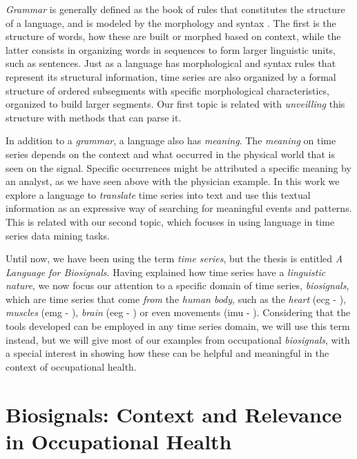 \textit{Grammar} is generally defined as the book of rules that constitutes the structure of a language, and is modeled by the morphology and syntax \cite{grammar}. The first is the structure of words, how these are built or morphed based on context, while the latter consists in organizing words in sequences to form larger linguistic units, such as sentences. Just as a language has morphological and syntax rules that represent its structural information, time series are also organized by a formal structure of ordered subsegments with specific morphological characteristics, organized to build larger segments. Our first topic is related with \textit{unveilling} this structure with methods that can parse it.
\par
In addition to a \textit{grammar}, a language also has \textit{meaning}. The \textit{meaning} on time series depends on the context and what occurred in the physical world that is seen on the signal. Specific occurrences might be attributed a specific meaning by an analyst, as we have seen above with the physician example. In this work we explore a language to \textit{translate} time series into text and use this textual information as an expressive way of searching for meaningful events and patterns. This is related with our second topic, which focuses in using language in time series data mining tasks.
\par
Until now, we have been using the term \textit{time series}, but the thesis is entitled \textit{A Language for Biosignals}. Having explained how time series have a \textit{linguistic nature}, we now focus our attention to a specific domain of time series, \textit{biosignals}, which are time series that come \textit{from} the \textit{human body}, such as the \textit{heart} (\gls{ecg} - ), \textit{muscles} (\gls{emg} - ), \textit{brain} (\gls{eeg} - ) or even movements (\gls{imu} - ). Considering that the tools developed can be employed in any time series domain, we will use this term instead, but we will give most of our examples from occupational \textit{biosignals}, with a special interest in showing how these can be helpful and meaningful in the context of occupational health.

\section{Biosignals: Context and Relevance in Occupational Health} 
\label{sub:context2}

